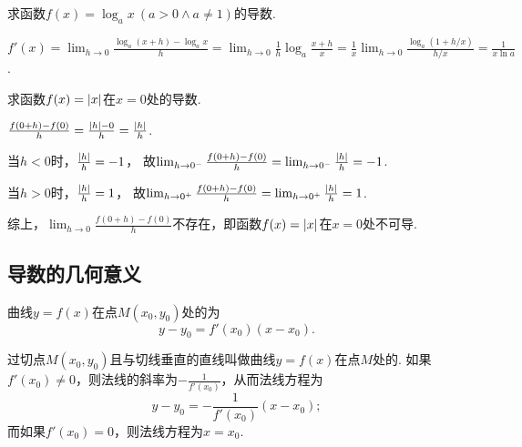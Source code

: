 \begin{example}
求函数\(f(x) = \log_a x\ (a > 0 \land a \neq 1)\)的导数.
\begin{solution}
\(f'(x)
= \lim_{h\to0}\frac{\log_a(x+h)-\log_a x}{h}
= \lim_{h\to0}{\frac{1}{h} \log_a\frac{x+h}{x}}
= \frac{1}{x} \lim_{h\to0}\frac{\log_a(1+h/x)}{h/x}
= \frac{1}{x \ln a}\).
\end{solution}
\end{example}

\begin{example}
求函数\(f(x) = \abs{x}\)在\(x=0\)处的导数.
\begin{solution}
\(\frac{f(0+h)-f(0)}{h} = \frac{\abs{h}-0}{h} = \frac{\abs{h}}{h}\).

当\(h < 0\)时，\(\frac{\abs{h}}{h} = -1\)，
故\(\lim_{h\to0^-}\frac{f(0+h)-f(0)}{h}
= \lim_{h\to0^-}\frac{\abs{h}}{h} = -1\).

当\(h > 0\)时，\(\frac{\abs{h}}{h} = 1\)，
故\(\lim_{h\to0^+}\frac{f(0+h)-f(0)}{h}
= \lim_{h\to0^+}\frac{\abs{h}}{h} = 1\).

综上，\(\lim_{h\to0}\frac{f(0+h)-f(0)}{h}\)不存在，即函数\(f(x) = \abs{x}\)在\(x = 0\)处不可导.
\end{solution}
\end{example}

\subsection{导数的几何意义}
\begin{theorem}
曲线\(y=f(x)\)在点\(M(x_0,y_0)\)处的为\[
	y-y_0=f'(x_0)(x-x_0).
\]

过切点\(M(x_0,y_0)\)且与切线垂直的直线叫做曲线\(y=f(x)\)在点\(M\)处的.
如果\(f'(x_0) \neq 0\)，则法线的斜率为\(-\frac{1}{f'(x_0)}\)，从而法线方程为\[
	y-y_0=-\frac{1}{f'(x_0)}(x-x_0);
\]
而如果\(f'(x_0) = 0\)，则法线方程为\(x = x_0\).
\end{theorem}

